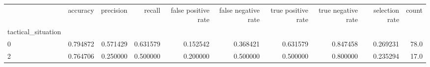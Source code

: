 \begin{tabular}{lrrrrrrrrr}
\toprule
{} &  accuracy &  precision &    recall &  false positive rate &  false negative rate &  true positive rate &  true negative rate &  selection rate &  count \\
tactical\_situation &           &            &           &                      &                      &                     &                     &                 &        \\
\midrule
0                  &  0.794872 &   0.571429 &  0.631579 &             0.152542 &             0.368421 &            0.631579 &            0.847458 &        0.269231 &   78.0 \\
2                  &  0.764706 &   0.250000 &  0.500000 &             0.200000 &             0.500000 &            0.500000 &            0.800000 &        0.235294 &   17.0 \\
\bottomrule
\end{tabular}
